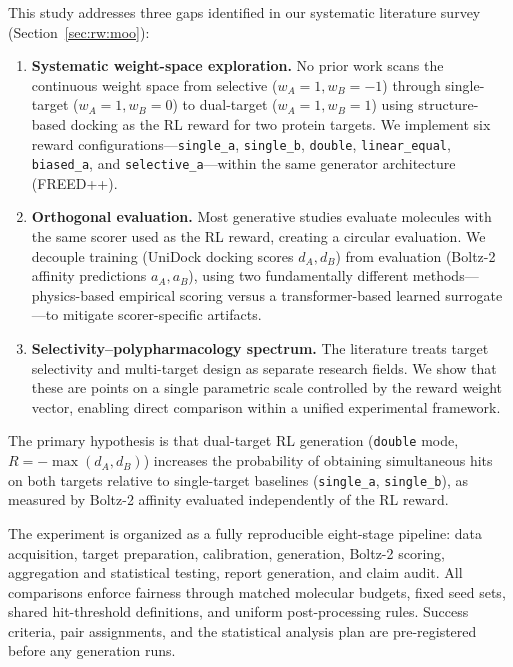 This study addresses three gaps identified in our systematic
literature survey (Section~\ref{sec:rw:moo}):
\begin{enumerate}
\item \textbf{Systematic weight-space exploration.}
  No prior work scans the continuous weight space from selective
  ($w_A{=}1, w_B{=}{-1}$) through single-target ($w_A{=}1, w_B{=}0$)
  to dual-target ($w_A{=}1, w_B{=}1$) using structure-based docking
  as the RL reward for two protein targets.
  We implement six reward configurations---\texttt{single\_a},
  \texttt{single\_b}, \texttt{double}, \texttt{linear\_equal},
  \texttt{biased\_a}, and \texttt{selective\_a}---within the same
  generator architecture (FREED++).
\item \textbf{Orthogonal evaluation.}
  Most generative studies evaluate molecules with the same scorer
  used as the RL reward, creating a circular evaluation.
  We decouple training (UniDock docking scores $d_A, d_B$) from
  evaluation (Boltz-2 affinity predictions $a_A, a_B$), using two
  fundamentally different methods---physics-based empirical scoring
  versus a transformer-based learned surrogate---to mitigate
  scorer-specific artifacts.
\item \textbf{Selectivity--polypharmacology spectrum.}
  The literature treats target selectivity and multi-target design
  as separate research fields.  We show that these are points on a
  single parametric scale controlled by the reward weight vector,
  enabling direct comparison within a unified experimental framework.
\end{enumerate}

The primary hypothesis is that dual-target RL generation
(\texttt{double} mode, $R = -\max(d_A, d_B)$) increases the
probability of obtaining simultaneous hits on both targets relative
to single-target baselines (\texttt{single\_a}, \texttt{single\_b}),
as measured by Boltz-2 affinity evaluated independently of the RL
reward.

The experiment is organized as a fully reproducible eight-stage
pipeline: data acquisition, target preparation, calibration,
generation, Boltz-2 scoring, aggregation and statistical
testing, report generation, and claim audit.
All comparisons enforce fairness through matched molecular budgets,
fixed seed sets, shared hit-threshold definitions, and uniform
post-processing rules.
Success criteria, pair assignments, and the statistical analysis
plan are pre-registered before any generation runs.
